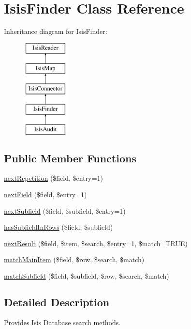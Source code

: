 \hypertarget{classIsisFinder}{
\section{IsisFinder Class Reference}
\label{classIsisFinder}
}
Inheritance diagram for IsisFinder:\begin{figure}[H]
\begin{center}
\leavevmode
\includegraphics[height=5.000000cm]{classIsisFinder}
\end{center}
\end{figure}
\subsection*{Public Member Functions}
\begin{DoxyCompactItemize}
\item 
\hyperlink{classIsisFinder_ac4e3a8f45995cbf940b3f2899b71bd1e}{nextRepetition} (\$field, \$entry=1)
\item 
\hyperlink{classIsisFinder_a7d708e281bea35ee38f5875c8f2cad8d}{nextField} (\$field, \$entry=1)
\item 
\hyperlink{classIsisFinder_aa367980783d341197e003684a639ff1a}{nextSubfield} (\$field, \$subfield, \$entry=1)
\item 
\hyperlink{classIsisFinder_a41410b18c4462c05ac669e4ee889d8a7}{hasSubfieldInRows} (\$field, \$subfield)
\item 
\hyperlink{classIsisFinder_af965ba4acae18aa61bc4a3242bcdadfc}{nextResult} (\$field, \$item, \$search, \$entry=1, \$match=TRUE)
\item 
\hyperlink{classIsisFinder_ab35a9bb21e83df846b6ff57bcbe117ae}{matchMainItem} (\$field, \$row, \$search, \$match)
\item 
\hyperlink{classIsisFinder_a20539e44cfc30ca3897e174781c4b26c}{matchSubfield} (\$field, \$subfield, \$row, \$search, \$match)
\end{DoxyCompactItemize}


\subsection{Detailed Description}
Provides Isis Database search methods. 

